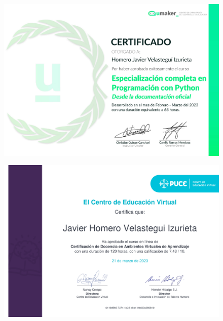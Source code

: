 \begin{figure}[ht]
    \setlength{\parindent}{-20pt}
    \includegraphics[width=\textwidth]{2.-Estudios/Certificados/16.pdf}
\end{figure}

\begin{figure}[ht]
    \setlength{\parindent}{-20pt}
    \includegraphics[width=\textwidth]{2.-Estudios/Certificados/14.pdf}
\end{figure}

